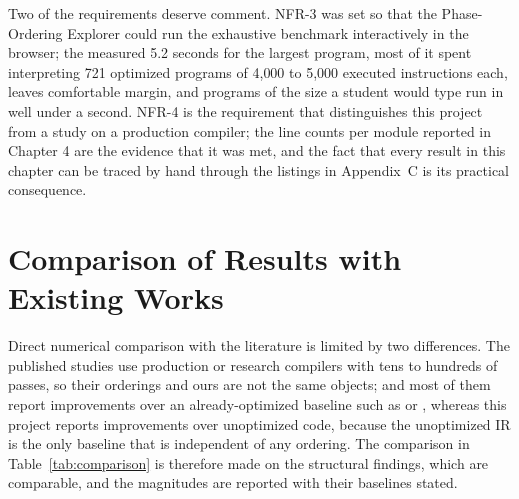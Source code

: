 Two of the requirements deserve comment. NFR-3 was set so that the Phase-Ordering Explorer could run the exhaustive benchmark interactively in the browser; the measured 5.2 seconds for the largest program, most of it spent interpreting 721 optimized programs of 4{,}000 to 5{,}000 executed instructions each, leaves comfortable margin, and programs of the size a student would type run in well under a second. NFR-4 is the requirement that distinguishes this project from a study on a production compiler; the line counts per module reported in Chapter 4 are the evidence that it was met, and the fact that every result in this chapter can be traced by hand through the listings in Appendix~C is its practical consequence.

\section{Comparison of Results with Existing Works}

Direct numerical comparison with the literature is limited by two differences. The published studies use production or research compilers with tens to hundreds of passes, so their orderings and ours are not the same objects; and most of them report improvements over an already-optimized baseline such as  or , whereas this project reports improvements over unoptimized code, because the unoptimized IR is the only baseline that is independent of any ordering. The comparison in Table~\ref{tab:comparison} is therefore made on the structural findings, which are comparable, and the magnitudes are reported with their baselines stated.

